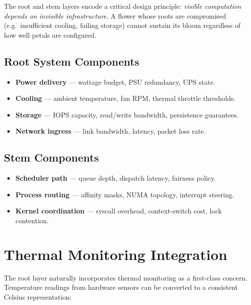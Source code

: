 \documentclass[11pt, a4paper, oneside]{article}
\theoremstyle{definition}
\begin{document}
The root and stem layers encode a critical design principle: \emph{visible
computation depends on invisible infrastructure}.  A flower whose roots are
compromised (e.g.\ insufficient cooling, failing storage) cannot sustain its
bloom regardless of how well petals are configured.

\subsection{Root System Components}

\begin{itemize}
  \item \textbf{Power delivery} — wattage budget, PSU redundancy, UPS state.
  \item \textbf{Cooling} — ambient temperature, fan RPM, thermal throttle
        thresholds.
  \item \textbf{Storage} — IOPS capacity, read/write bandwidth, persistence
        guarantees.
  \item \textbf{Network ingress} — link bandwidth, latency, packet loss rate.
\end{itemize}

\subsection{Stem Components}

\begin{itemize}
  \item \textbf{Scheduler path} — queue depth, dispatch latency, fairness
        policy.
  \item \textbf{Process routing} — affinity masks, NUMA topology, interrupt
        steering.
  \item \textbf{Kernel coordination} — syscall overhead, context-switch cost,
        lock contention.
\end{itemize}

\section{Thermal Monitoring Integration}

The root layer naturally incorporates thermal monitoring as a first-class
concern.  Temperature readings from hardware sensors can be converted to
a consistent Celsius representation:
\end{document}
